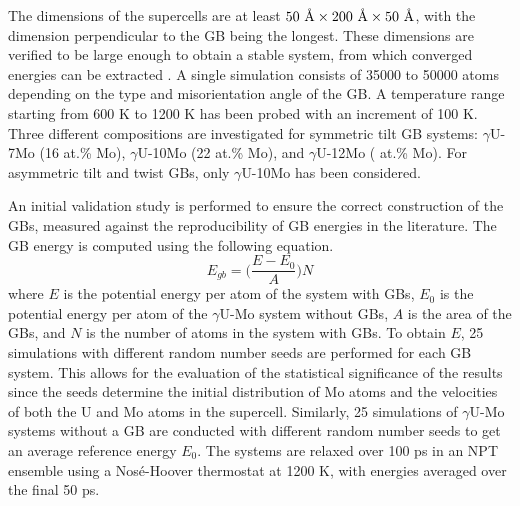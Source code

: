 \documentclass{elsarticle}
\providecommand{\DIFadd}[1]{{\protect\color{blue} \sf #1}} %
\providecommand{\DIFdel}[1]{}
\providecommand{\DIFaddbegin}{} %
\providecommand{\DIFaddend}{} %
\providecommand{\DIFdelbegin}{} %
\providecommand{\DIFdelend}{} %
\begin{document}
The dimensions of the supercells are at least $50 \text{ \r{A}} \times 200 \text{ \r{A}} \times 50 \text{ \r{A}}$, with the dimension perpendicular to the GB being the longest. These \DIFdelbegin \DIFdel{systems }\DIFdelend \DIFaddbegin \DIFadd{dimensions }\DIFaddend are verified to be large enough to obtain a stable system, from which converged energies can be extracted \cite{beeler2018}. A single simulation consists of 35000 to 50000 atoms depending on the type and misorientation angle of the GB. A temperature range starting from 600 K to 1200 K has been probed with an increment of 100 K. Three different compositions are investigated for symmetric tilt GB systems: $\gamma$U-7Mo \DIFaddbegin \DIFadd{(16 at.\% Mo)}\DIFaddend , $\gamma$U-10Mo \DIFaddbegin \DIFadd{(22 at.\% Mo)}\DIFaddend , and $\gamma$U-12Mo (\DIFdelbegin \DIFdel{in weight percent}\DIFdelend \DIFaddbegin \DIFadd{25 at.\% Mo}\DIFaddend ). For asymmetric tilt and twist GBs, only $\gamma$U-10Mo has been considered.
\DIFdelbegin \DIFdel{For any single GB at a given temperature, five simulations are performed }\DIFdelend \DIFaddbegin 

\DIFadd{An initial validation study is performed to ensure the correct construction of the GBs, measured against the reproducibility of GB energies in the literature. The GB energy is computed using the following equation.
}\begin{equation}
	E_{gb} = \bigg( \frac{E - E_0}{A} \bigg) N
\end{equation}
\DIFadd{where $E$ is the potential energy per atom of the system with GBs, $E_0$ is the potential energy per atom of the $\gamma$U-Mo system without GBs, $A$ is the area of the GBs, and $N$ is the number of atoms in the system with GBs. To obtain $E$, 25 simulations }\DIFaddend with different random number seeds \DIFaddbegin \DIFadd{are performed for each GB system}\DIFaddend . This allows for the evaluation of the statistical significance of the results since the seeds determine the initial distribution of Mo atoms and the velocities of both the U and Mo atoms in the supercell. \DIFaddbegin \DIFadd{Similarly, 25 simulations of $\gamma$U-Mo systems without a GB are conducted with different random number seeds to get an average reference energy $E_0$. The systems are relaxed over 100 ps in an NPT ensemble using a Nos\'e-Hoover thermostat at 1200 K, with energies averaged over the final 50 ps.
}\DIFaddend 
\end{document}

